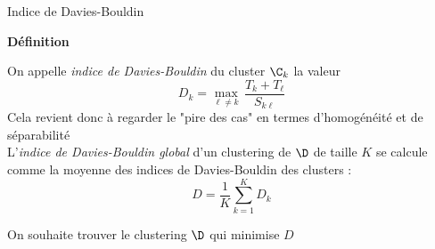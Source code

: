 \documentclass[10pt]{beamer}
\newcommand{\hsp}{\hspace*{1em}}
\begin{document}
\begin{frame}{Indice de Davies-Bouldin}
	
		\textcolor{MPTblue}{\large\textbf{Définition}}\\
	\vspace*{-0.1em}		
	\begin{vblock}{}
		On appelle \textit{indice de Davies-Bouldin} du cluster $\C_k$ la valeur
		$$ D_{k}= \underset{\ell\neq k}{\max} \, \dfrac{T_k + T_\ell}{S_{k\ell}} $$
		Cela revient donc à regarder le "pire des cas" en termes d'homogénéité et de séparabilité\\[1em]
		L'\textit{indice de Davies-Bouldin global} d’un clustering de $\D$ de taille $K$ se calcule comme la moyenne des indices de  Davies-Bouldin des clusters :
		$$ D = \dfrac{1}{K}\sum_{k=1}^K D_k$$	
		\vspace*{-1.2em}
	\end{vblock}

\vspace*{1em}

 \hsp On souhaite trouver le clustering $\D$ qui minimise $D$\\[1em]
	
\end{frame}
\end{document}
